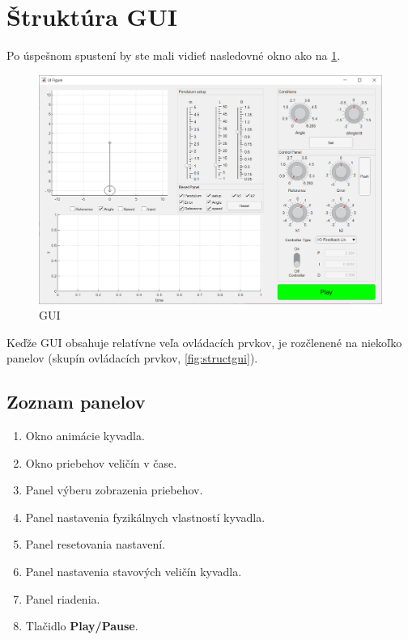 \section{Štruktúra GUI}
Po úspešnom spustení by ste mali vidieť nasledovné okno ako na \cref{fig:gui}.
	\begin{figure}[h!]
	\centering
	\includegraphics[width=0.9\linewidth]{gui}
	\caption{GUI}
	\label{fig:gui}
\end{figure}
Keďže GUI obsahuje relatívne veľa ovládacích prvkov, je rozčlenené na niekoľko panelov (skupín ovládacích prvkov, \cref{fig:structgui}). 

\subsection{Zoznam panelov}
\begin{enumerate}
	\item Okno animácie kyvadla.
	\item Okno priebehov veličín v čase.
	\item Panel výberu zobrazenia priebehov.
	\item Panel nastavenia fyzikálnych vlastností kyvadla.
	\item Panel resetovania nastavení.
	\item Panel nastavenia stavových veličín kyvadla.
	\item Panel riadenia.
	\item Tlačidlo \textbf{Play/Pause}.
\end{enumerate}

\makeatletter
\setlength{\@fptop}{0pt}
\makeatother

